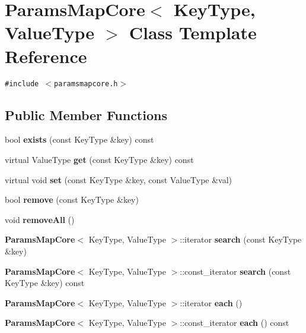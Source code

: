 \section{ParamsMapCore$<$ KeyType, ValueType $>$ Class Template Reference}
\label{classParamsMapCore}
{\tt \#include $<$paramsmapcore.h$>$}

\subsection*{Public Member Functions}
\begin{CompactItemize}
\item 
bool \textbf{exists} (const KeyType \&key) const \label{classParamsMapCore_0fb2a382ee9842a5d55fdae04714d295}

\item 
virtual ValueType \textbf{get} (const KeyType \&key) const \label{classParamsMapCore_6611cce745de15689e0581166dc4d77e}

\item 
virtual void \textbf{set} (const KeyType \&key, const ValueType \&val)\label{classParamsMapCore_9d3efca80d0911e64239439f0a29c032}

\item 
bool \textbf{remove} (const KeyType \&key)\label{classParamsMapCore_ced22fd45f927f69867de46cce5978d2}

\item 
void \textbf{removeAll} ()\label{classParamsMapCore_e927ec4fa28082d6617cb8b4849790f6}

\item 
{\bf ParamsMapCore}$<$ KeyType, ValueType $>$::iterator \textbf{search} (const KeyType \&key)\label{classParamsMapCore_0d2ce1e37841651bda9d711dddbc48bf}

\item 
{\bf ParamsMapCore}$<$ KeyType, ValueType $>$::const\_\-iterator \textbf{search} (const KeyType \&key) const \label{classParamsMapCore_f72633d4af39406e68a23baed7926b5d}

\item 
{\bf ParamsMapCore}$<$ KeyType, ValueType $>$::iterator \textbf{each} ()\label{classParamsMapCore_fb91da94a9a521a5d0a17aa6f273e3e7}

\item 
{\bf ParamsMapCore}$<$ KeyType, ValueType $>$::const\_\-iterator \textbf{each} () const \label{classParamsMapCore_93bfff73809d7ca5e1727637fd83fbff}

\end{CompactItemize}


